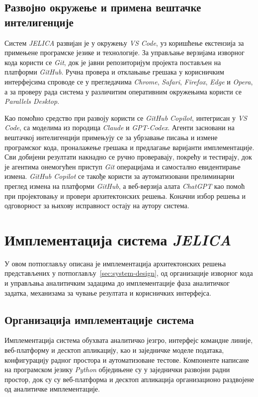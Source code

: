 \documentclass[12pt,oneside]{memoir}
\begin{document}
\subsection{Развојно окружење и примена вештачке интелигенције}
Систем \textit{JELICA} развијан је у окружењу \textit{VS Code}, уз коришћење екстензија за примењене програмске језике и технологије. За управљање верзијама изворног кода користи се \textit{Git}, док је јавни репозиторијум пројекта постављен на платформи \textit{GitHub}. Ручна провера и отклањање грешака у корисничким интерфејсима спроводе се у прегледачима \textit{Chrome}, \textit{Safari}, \textit{Firefox}, \textit{Edge} и \textit{Opera}, а за проверу рада система у различитим оперативним окружењима користи се \textit{Parallels Desktop}.

Као помоћно средство при развоју користи се \textit{GitHub Copilot}, интегрисан у \textit{VS Code}, са моделима из породица \textit{Claude} и \textit{GPT-Codex}. Агенти засновани на вештачкој интелигенцији примењују се за убрзавање писања и измене програмског кода, проналажење грешака и предлагање варијанти имплементације. Сви добијени резултати накнадно се ручно проверавају, покрећу и тестирају, док је агентима онемогућен приступ \textit{Git} операцијама и самостално евидентирање измена. \textit{GitHub Copilot} се такође користи за аутоматизовани прелиминарни преглед измена на платформи \textit{GitHub}, а веб-верзија алата \textit{ChatGPT} као помоћ при пројектовању и провери архитектонских решења. Коначни избор решења и одговорност за њихову исправност остају на аутору система.


\section{Имплементација система \textit{JELICA}}
У овом потпоглављу описана је имплементација архитектонских решења представљених у потпоглављу~\ref{sec:system-design}, од организације изворног кода и управљања аналитичким задацима до имплементације фаза аналитичког задатка, механизама за чување резултата и корисничких интерфејса.


\subsection{Организација имплементације система}
Имплементација система обухвата аналитичко језгро, интерфејс командне линије, веб-платформу и десктоп апликацију, као и заједничке моделе података, конфигурацију радног простора и аутоматизоване тестове. Компоненте написане на програмском језику \textit{Python} обједињене су у заједнички развојни радни простор, док су су веб-платформа и десктоп апликација организационо раздвојене од аналитичке имплементације.
\end{document}
